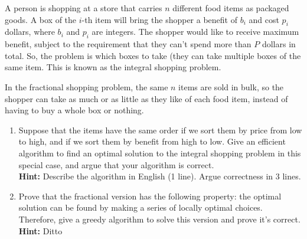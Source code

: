 \documentclass[11pt]{article}
\begin{document}
A person is shopping at a store that carries $n$ different food items as packaged goods. A box of the $i$-th item will bring the shopper a benefit of $b_i$ and cost $p_i$ dollars, where $b_i$ and $p_i$ are integers. The shopper would like to receive maximum benefit, subject to the requirement that they can't spend more than $P$ dollars in total. So, the problem is which boxes to take (they can take multiple boxes of the same item. This is known as the integral shopping problem.

In the fractional shopping problem, the same $n$ items are sold in bulk, so the shopper can take as much or as little as they like of each food item, instead of having to buy a whole box or nothing.

\begin{enumerate}
\item Suppose that the items have the same order if we sort them by price from low to high, and if we sort them by benefit from high to low. Give an efficient algorithm to find an optimal solution to the integral shopping problem in this special case, and argue that your algorithm is correct.\\
\textbf{Hint:} Describe the algorithm in English (1 line). Argue correctness in 3 lines.
\item Prove that the fractional version has the following property: the optimal solution can be found by making a series of locally optimal choices. Therefore, give a greedy algorithm to solve this version and prove it's correct.\\
\textbf{Hint:} Ditto
\end{enumerate}
\end{document}
